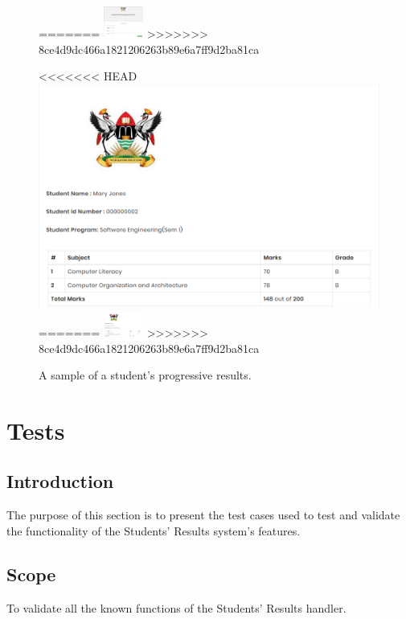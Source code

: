 \begin{enumerate}
\begin{figure}[H]
=======
\includegraphics[width=1.3cm]{images/student_login.png}
>>>>>>> 8ce4d9dc466a1821206263b89e6a7ff9d2ba81ca
\end{figure}
\begin{figure}[H]
\caption{A sample of a student's progressive results.}
<<<<<<< HEAD
\includegraphics[scale=0.4]{images/results.png}
=======
\includegraphics[width=1.3cm]{images/results.png}
>>>>>>> 8ce4d9dc466a1821206263b89e6a7ff9d2ba81ca
\end{figure}
\end{enumerate}
\section{Tests}
\subsection{Introduction}
The purpose of this section is to present the test cases used to test and validate the functionality of the Students' Results system's features.
\subsection{Scope}
To validate all the known functions of the Students' Results handler.
